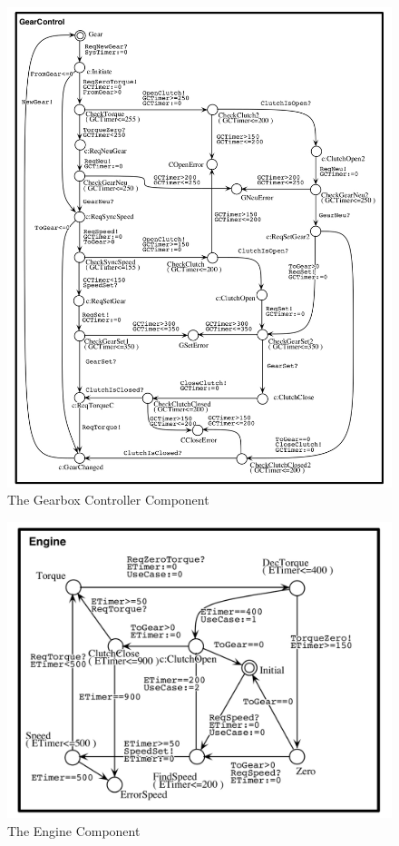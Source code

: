 \begin{figure}[H]       
\centering            
\includegraphics[scale=.55]{Figures/gbgc}
\caption{The Gearbox Controller Component}
\label{fig:gbgc}         
\end{figure}  

\begin{figure}[H]       
\centering            
\includegraphics[scale=0.3]{Figures/gbe}
\caption{The Engine Component}
\label{fig:gbe}         
\end{figure}  

